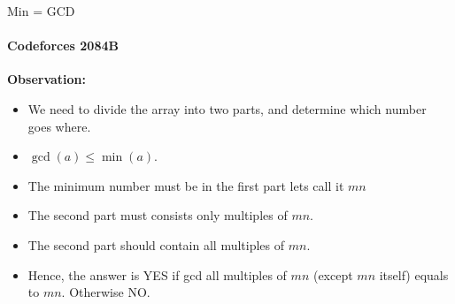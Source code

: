 \begin{frame}{Min = GCD}
	\framesubtitle{Codeforces 2084B}
	\textbf{Observation:} \\
	\begin{itemize}
		\item <1-> We need to divide the array into two parts, and determine which number goes where.
		\item <2-> $\gcd{(a)} \leq \min{(a)}$.
		\item <3-> The minimum number must be in the first part lets call it $mn$
		\item <4-> The second part must consists only multiples of $mn$.
		\item <5-> The second part should contain all multiples of $mn$.
		\item <6-> Hence, the answer is YES if gcd all multiples of $mn$ (except $mn$ itself) equals to $mn$. Otherwise NO.
	\end{itemize}
\end{frame}


